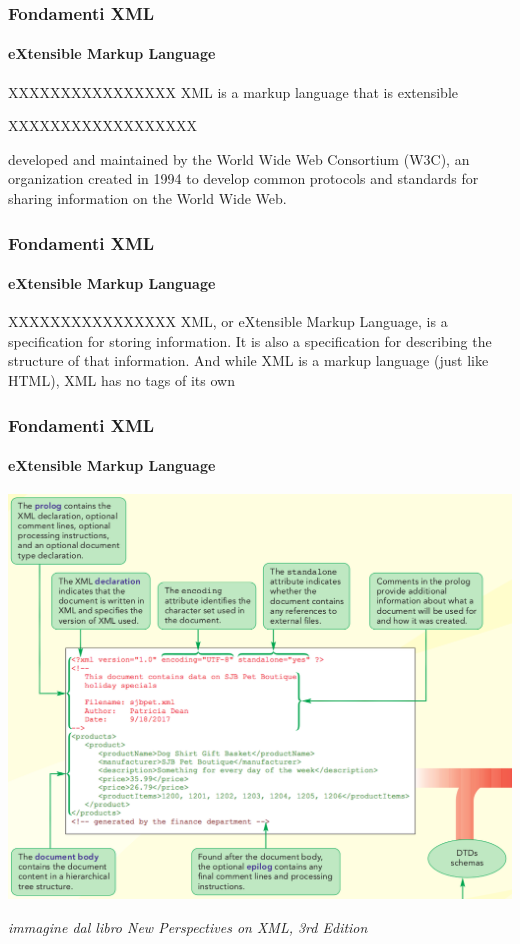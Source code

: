 \begin{frame}
	\frametitle{Fondamenti XML}
	\framesubtitle{eXtensible Markup Language}
	\addtocounter{nframe}{1}

	\begin{block}{XXXXXXXXXXXXXXXX}
		XML is a markup language that is extensible
	\end{block}

	\begin{block} {XXXXXXXXXXXXXXXXXX}

		developed and maintained by the World Wide Web Consortium (W3C),
		an organization created in 1994 to develop common protocols and standards for
		sharing information on the World Wide Web.

	\end{block}
\end{frame}

\begin{frame}
	\frametitle{Fondamenti XML}
	\framesubtitle{eXtensible Markup Language}
	\addtocounter{nframe}{1}

	\begin{block}{XXXXXXXXXXXXXXXX}
		XML, or eXtensible Markup Language, is a
		specification for storing information. It is also
		a specification for describing the structure of
		that information. And while XML is a markup
		language (just like HTML), XML has no tags
		of its own
	\end{block}

\end{frame}


\begin{frame}
	\frametitle{Fondamenti XML}
	\framesubtitle{eXtensible Markup Language}
	\addtocounter{nframe}{1}

	\begin{center}
		\includegraphics[width=.8\textwidth]{imgs/intro-doc-xml.png}
	\end{center}

	\begin{tiny}\textit{immagine dal libro New Perspectives on XML, 3rd Edition}\end{tiny}

\end{frame}


